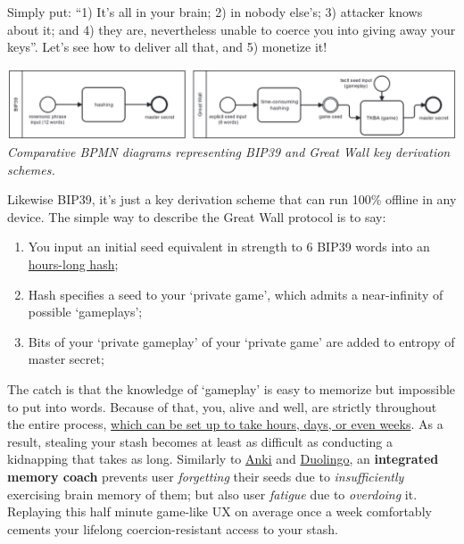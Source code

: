 \documentclass[8pt]{article}
\newcommand{\faqurl}{https://tr.ee/gwfaq}
\begin{document}
\noindent
Simply put: ``1) It's all in your brain; 2) in nobody else's; 3) attacker knows about it; and 4) they are, nevertheless unable to coerce you into giving away your keys''. Let's see how to deliver all that, and 5) monetize it!

\begin{center}
    \includegraphics[width=1\textwidth]{gw-one-pager-diagram.png}
    \textit{Comparative BPMN diagrams representing BIP39 and Great Wall key derivation schemes.}
\end{center}

\noindent
Likewise BIP39, it's just a key derivation scheme that can run 100\% offline in any device. The simple way to describe the Great Wall protocol is to say:

\begin{enumerate}
 \item You input an initial seed equivalent in strength to 6 BIP39 words into an \href{\faqurl}{hours-long hash};
 \item Hash specifies a seed to your `private game', which admits a near-infinity of possible `gameplays';
 \item Bits of your `private gameplay' of your `private game' are added to entropy of master secret;
\end{enumerate}

\noindent
The catch is that the knowledge of `gameplay' is easy to memorize but impossible to put into words. Because of that, you, alive and well, are strictly throughout the entire process, \href{\faqurl}{which can be set up to take hours, days, or even weeks}. As a result, stealing your stash becomes at least as difficult as conducting a kidnapping that takes as long. Similarly to \href{https://apps.ankiweb.net/}{Anki} and \href{https://www.duolingo.com/}{Duolingo}, an \textbf{integrated memory coach} prevents user \textit{forgetting} their seeds due to \textit{insufficiently} exercising brain memory of them; but also user \textit{fatigue} due to \textit{overdoing} it. Replaying this half minute game-like UX on average once a week comfortably cements your lifelong coercion-resistant access to your stash.

\vspace{0.3cm}
\end{document}
